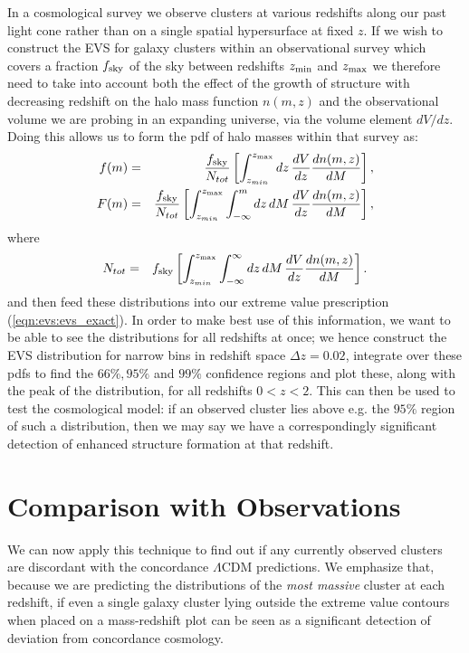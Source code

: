 \documentclass[twocolumn,useAMS,usenatbib,usegraphicx]{mn2e}
\newcommand{\lcdm}{$\Lambda$CDM }
\newcommand{\fsky}{f_{\rm sky}}
\begin{document}
In a cosmological survey we observe clusters at various redshifts
along our past light cone rather than on a single spatial
hypersurface at fixed $z$. If we wish to construct the EVS for
galaxy clusters within an observational survey which covers a
fraction $\fsky$ of the sky between redshifts $z_{\rm min}$ and
$z_{\rm max}$ we therefore need to take into account both the effect
of the growth of structure with decreasing redshift on the halo mass
function $n(m,z)$ and the observational volume we are probing in an
expanding universe, via the volume element $dV/dz$. Doing this
allows us to form the pdf of halo masses within that survey as:
\begin{eqnarray}
        \label{eqn:obs_pdf}
        f(m) &=& \frac{\fsky}{N_{tot}}\left[ \int^{z_{\rm max}}_{z_{min}} dz \, \frac{dV}{dz}\frac{dn(m, z)}{dM} \right], \\
        F(m) &=& \frac{\fsky}{N_{tot}}\left[ \int^{z_{\rm max}}_{z_{min}} \int^{m}_{-\infty} dz \, dM \, \frac{dV}{dz}\frac{dn(m, z)}{dM} \right],
\end{eqnarray}
where
\begin{eqnarray}
        \label{eqn:obs_norm}
        N_{tot} &=& \fsky \left[ \int^{z_{\rm max}}_{z_{min}} \int^{\infty}_{-\infty} dz \, dM \, \frac{dV}{dz}\frac{dn(m, z)}{dM} \right].
\end{eqnarray}
and then feed these distributions into our extreme value
prescription (\ref{eqn:evs:evs_exact}). In order to make best use of
this information, we want to be able to see the distributions for
all redshifts at once; we hence construct the EVS distribution for
narrow bins in redshift space $\Delta z = 0.02$, integrate over
these pdfs to find the $66\%, 95\%$ and $99\%$ confidence regions
and plot these, along with the peak of the distribution, for all
redshifts $0 < z < 2$. This can then be used to test the
cosmological model: if an observed cluster lies above e.g. the
$95\%$ region of such a distribution, then we may say we have a
correspondingly significant detection of enhanced structure
formation at that redshift.
\section{Comparison with Observations}
\label{sec:lcdm} We can now apply this technique to find out if any
currently observed clusters are discordant with the concordance
\lcdm predictions. We emphasize that, because we are predicting the
distributions of the \textit{most massive} cluster at each redshift,
if even a single galaxy cluster lying outside the extreme value
contours when placed on a mass-redshift plot can be seen as a
significant detection of deviation from concordance cosmology.
\end{document}
